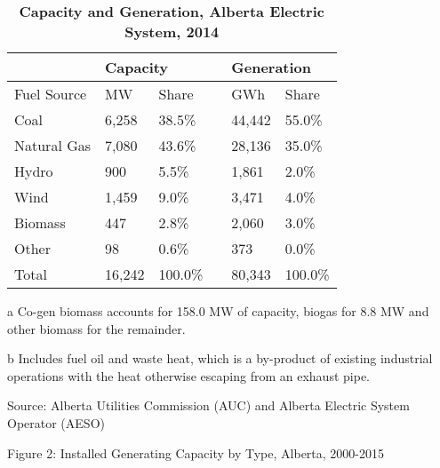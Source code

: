 \begin{table}[tbp]
\centering

\begin{threeparttable}
\caption{\bf Capacity and Generation, Alberta Electric System, 2014}
\label{my-label}
\begin{tabular}{@{}llllll@{}}
\toprule
            & \multicolumn{2}{l}{Capacity} &  & \multicolumn{2}{l}{Generation} \\ \midrule
Fuel Source & MW           & Share         &  & GWh           & Share          \\
Coal        & 6,258        & 38.5\%        &  & 44,442        & 55.0\%         \\
Natural Gas & 7,080        & 43.6\%        &  & 28,136        & 35.0\%         \\
Hydro       & 900          & 5.5\%         &  & 1,861         & 2.0\%          \\
Wind        & 1,459        & 9.0\%         &  & 3,471         & 4.0\%          \\
Biomass\tnote{a}    & 447          & 2.8\%         &  & 2,060         & 3.0\%          \\
Other\tnote{b}      & 98           & 0.6\%         &  & 373           & 0.0\%          \\
Total       & 16,242       & 100.0\%       &  & 80,343        & 100.0\%        \\ \bottomrule
\end{tabular}

    \begin{tablenotes}
      \small
      \item[a] Co-gen biomass accounts for 158.0 MW of capacity, biogas for 8.8 MW and other biomass for the remainder.
      \item[b]  Includes fuel oil and waste heat, which is a by-product of existing industrial operations with the heat otherwise escaping from an exhaust pipe.
      \item Source: Alberta Utilities Commission (AUC) and Alberta Electric System Operator (AESO)
    \end{tablenotes}
    
\end{threeparttable}
\end{table}




 
Figure 2: Installed Generating Capacity by Type, Alberta, 2000-2015



